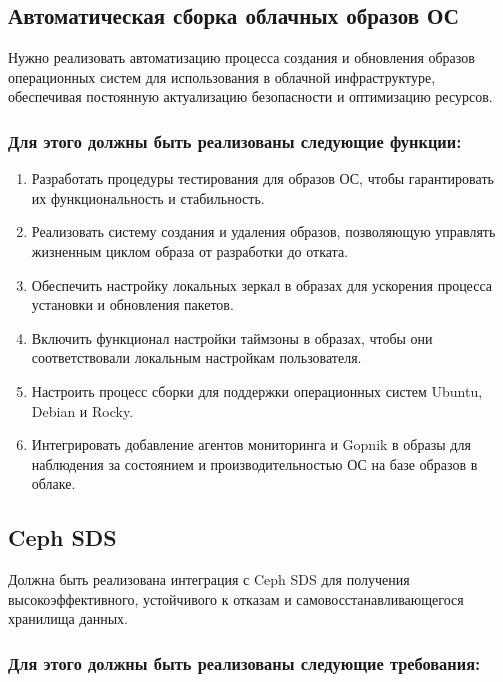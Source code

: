 \documentclass[14pt, a4paper]{extarticle}
\begin{document}
\subsection{Автоматическая сборка облачных образов ОС}

Нужно реализовать автоматизацию процесса создания и обновления образов операционных систем для использования в облачной инфраструктуре, обеспечивая постоянную актуализацию безопасности и оптимизацию ресурсов.

\subsubsection*{Для этого должны быть реализованы следующие функции:}

\begin{enumerate}
\item Разработать процедуры тестирования для образов ОС, чтобы гарантировать их функциональность и стабильность.
\item Реализовать систему создания и удаления образов, позволяющую управлять жизненным циклом образа от разработки до отката.
\item Обеспечить настройку локальных зеркал в образах для ускорения процесса установки и обновления пакетов.
\item Включить функционал настройки таймзоны в образах, чтобы они соответствовали локальным настройкам пользователя.
\item Настроить процесс сборки для поддержки операционных систем Ubuntu, Debian и Rocky.
\item Интегрировать добавление агентов мониторинга и Gopnik в образы для наблюдения за состоянием и производительностью ОС на базе образов в облаке.
\end{enumerate}

\subsection{Ceph SDS}

Должна быть реализована интеграция с Ceph SDS для получения высокоэффективного, устойчивого к отказам и самовосстанавливающегося хранилища данных.

\subsubsection*{Для этого должны быть реализованы следующие требования:}
\end{document}
